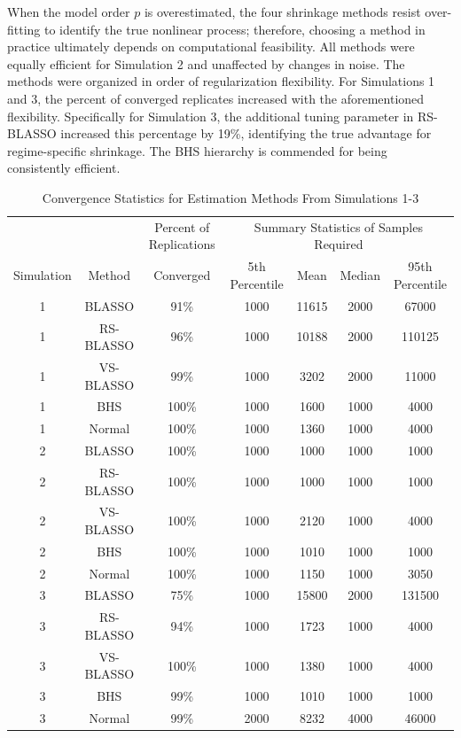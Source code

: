 When the model order $p$ is overestimated, the four shrinkage methods resist over-fitting to identify the true nonlinear process; therefore, choosing a method in practice ultimately depends on computational feasibility. All methods were equally efficient for Simulation 2 and unaffected by changes in noise. The methods were organized in order of regularization flexibility. For Simulations 1 and 3, the percent of converged replicates increased with the aforementioned flexibility. Specifically for Simulation 3, the additional tuning parameter in RS-BLASSO increased this percentage by 19\%, identifying the true advantage for regime-specific shrinkage. The BHS hierarchy is commended for being consistently efficient.

\begin{table}[!h]
\tiny
  \centering
  \caption{Convergence Statistics for Estimation Methods From Simulations 1-3}
    \begin{tabular}{cc|c|cccc}
    \toprule
    & & Percent of Replications & \multicolumn{4}{c}{Summary Statistics of Samples Required}\\
    Simulation & Method & Converged  & 5th Percentile   & Mean & Median & 95th Percentile \\
    \midrule
    1    & BLASSO & 91\%   & 1000 & 11615 & 2000 & 67000 \\
    1    & RS-BLASSO & 96\%    & 1000 & 10188 & 2000 & 110125 \\
    1    & VS-BLASSO & 99\%    & 1000 & 3202 & 2000 & 11000 \\
    1    & BHS  & 100\%   & 1000 & 1600 & 1000 & 4000 \\
    1    & Normal & 100\%   & 1000 & 1360 & 1000 & 4000 \\
    \midrule
    2    & BLASSO & 100\%   & 1000 & 1000 & 1000 & 1000 \\
    2    & RS-BLASSO & 100\%   & 1000 & 1000 & 1000 & 1000 \\
    2    & VS-BLASSO & 100\%   & 1000 & 2120 & 1000 & 4000 \\
    2    & BHS  & 100\%   & 1000 & 1010 & 1000 & 1000 \\
    2    & Normal & 100\%   & 1000 & 1150 & 1000 & 3050 \\
    \midrule
    3    & BLASSO & 75\%    & 1000 & 15800 & 2000 & 131500 \\
    3    & RS-BLASSO & 94\%    & 1000 & 1723 & 1000 & 4000 \\
    3    & VS-BLASSO & 100\%   & 1000 & 1380 & 1000 & 4000 \\
    3    & BHS  & 99\%    & 1000 & 1010 & 1000 & 1000 \\
    3    & Normal & 99\%    & 2000 & 8232 & 4000 & 46000 \\
    \bottomrule
    \end{tabular}%
  \label{tab:convtable}%
\end{table}%

